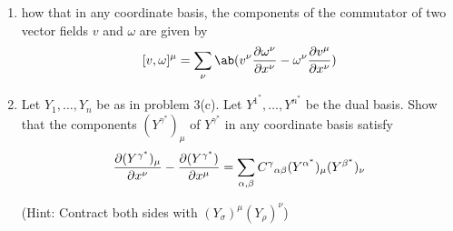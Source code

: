 \begin{problem}\leavevmode
    \begin{enumerate}[label=(\alph*)]
        \item how that in any coordinate basis, the components of the commutator of two vector fields $v$ and $\omega$ are given by
        \[[v,\omega]^\mu=\sum_\nu\ab(v^\nu\pdv{\omega^\nu}{x^\nu}-\omega^\nu\pdv{v^\mu}{x^\nu})\]
        \item Let $Y_1,\ldots,Y_n$ be as in problem 3(c). Let $Y^{1^*},\ldots,Y^{n^*}$ be the dual basis. Show that the components $(Y^{\gamma^*})_\mu$ of $Y^{\gamma^*}$ in any coordinate basis satisfy
        \[\pdv{(Y^{\gamma^*})_\mu}{x^\nu}-\pdv{(Y^{\gamma^*})}{x^\mu}=\sum_{\alpha,\beta}{C^\gamma}_{\alpha\beta}(Y^{\alpha^*})_\mu(Y^{\beta^*})_\nu\]

        (Hint: Contract both sides with $(Y_\sigma)^\mu(Y_\rho)^\nu$)
    \end{enumerate}
\end{problem}
